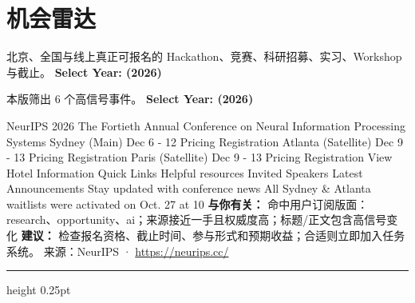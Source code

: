 \documentclass[10.5pt]{ctexart}
\begin{document}
\section*{机会雷达}
{\color{ormuted} 北京、全国与线上真正可报名的 Hackathon、竞赛、科研招募、实习、Workshop 与截止。}
\vspace{2mm}
{\LARGE\bfseries Select Year: (2026)}\par
\vspace{1mm}
{\color{ormuted} 本版筛出 6 个高信号事件。}
\vspace{3mm}
{\Large\bfseries Select Year: (2026)}\par
NeurIPS 2026 The Fortieth Annual Conference on Neural Information Processing Systems Sydney (Main) Dec 6 - 12 Pricing Registration Atlanta (Satellite) Dec 9 - 13 Pricing Registration Paris (Satellite) Dec 9 - 13 Pricing Registration View Hotel Information Quick Links Helpful resources Invited Speakers Latest Announcements Stay updated with conference news All Sydney \& Atlanta waitlists were activated on Oct. 27 at 10
\textbf{与你有关：} 命中用户订阅版面：research、opportunity、ai；来源接近一手且权威度高；标题/正文包含高信号变化
\textbf{建议：} 检查报名资格、截止时间、参与形式和预期收益；合适则立即加入任务系统。
{\footnotesize\color{ormuted} 来源：NeurIPS · \url{https://neurips.cc/}}
\vspace{4mm}
\hrule height 0.25pt
\vspace{3mm}
\end{document}
